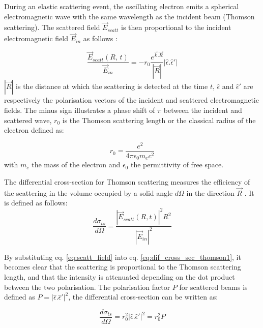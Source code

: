 During an elastic scattering event, the oscillating electron emits a spherical electromagnetic wave with the same wavelength as the incident beam (Thomson scattering).
The scattered field $\vec{E}_{scatt}$ is then proportional to the incident electromagnetic field $\vec{E}_{in}$ as follows \parencite{NielsenMcMorrow}:

\begin{equation}
    \label{eq:scatt_field}
    \frac{\vec{E}_{scatt}(R, \, t)} {\vec{E}_{in}} = -r_0 \frac{e^{\vec{k}.\vec{R}}} {|\vec{R}|}| \hat{\epsilon}.\hat{\epsilon}'|
\end{equation}
$|\vec{R}|$ is the distance at which the scattering is detected at the time $t$, $\hat{\epsilon}$ and $\hat{\epsilon}'$ are respectively the polarisation vectors of the incident and scattered electromagnetic fields.
The minus sign illustrates a phase shift of $\pi$ between the incident and scattered wave, $r_0$ is the Thomson scattering length or the classical radius of the electron defined as:

\begin{equation}
    \label{eq:scatt_thomson_scat_length}
    r_0 = \frac{e^2} {4\pi\epsilon_0 m_e c^2}
\end{equation}
with $m_e$ the mass of the electron and $\epsilon_0$ the permittivity of free space.

The differential cross-section for Thomson scattering measures the efficiency of the scattering in the volume occupied by a solid angle $d\Omega$ in the direction $\vec{R}$ \parencite{NielsenMcMorrow}. It is defined as follows:
\begin{equation}
    \label{eq:dif_cross_sec_thomson1}
    \frac{d\sigma_{ts}} {d \Omega} = \frac{ |\vec{E}_{scatt}(R, t)|^2 R^2} {|\vec{E}_{in}|^2}
\end{equation}

By substituting eq. \ref{eq:scatt_field} into eq. \ref{eq:dif_cross_sec_thomson1}, it becomes clear that the scattering is proportional to the Thomson scattering length, and that the intensity is attenuated depending on the dot product between the two polarisation.
The polarisation factor $P$ for scattered beams is defined as $P =  | \hat{\epsilon}.\hat{\epsilon}'|^2$, the differential cross-section can be written as:

\begin{equation}
    \label{eq:dif_cross_sec_thomson2}
    \frac{d\sigma_{ts}} {d \Omega} = r_0^2 | \hat{\epsilon}.\hat{\epsilon}'|^2 = r_0^2 P
\end{equation}


